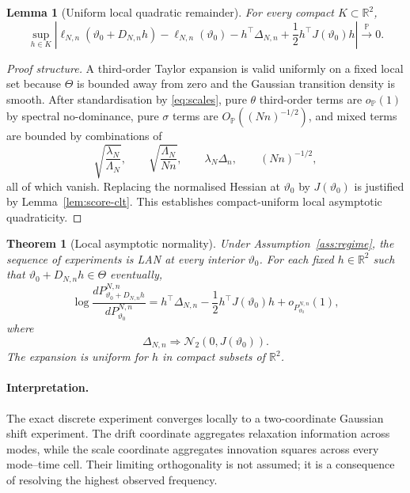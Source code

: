 \documentclass[11pt]{article}
\newtheorem{theorem}[assumption]{Theorem}
\newtheorem{lemma}[assumption]{Lemma}
\theoremstyle{remark}
\newcommand{\Pp}{\mathbb P}
\newcommand{\R}{\mathbb R}
\newcommand{\1}{\mathbf 1}
\newcommand{\elln}{\ell_{N,n}}
\newcommand{\LamN}{\Lambda_N}
\newcommand{\Dn}{D_{N,n}}
\newcommand{\vzero}{\vartheta_0}
\begin{document}
\begin{lemma}[Uniform local quadratic remainder]\label{lem:remainder}
For every compact $K\subset\R^2$,
\begin{equation}\label{eq:remainder}
 \sup_{h\in K}\left|
 \elln(\vzero+\Dn h)-\elln(\vzero)
 -h^\top\Delta_{N,n}
 +\frac12h^\top J(\vzero)h
 \right|
 \overset{\Pp}{\longrightarrow}0.
\end{equation}
\end{lemma}

\begin{proof}[Proof structure]
A third-order Taylor expansion is valid uniformly on a fixed local set because $\Theta$ is bounded away from zero and the Gaussian transition density is smooth.  After standardisation by \eqref{eq:scales}, pure $\theta$ third-order terms are $o_{\Pp}(1)$ by spectral no-dominance, pure $\sigma$ terms are $O_{\Pp}((Nn)^{-1/2})$, and mixed terms are bounded by combinations of
\[
 \sqrt{\frac{\lambda_N}{\LamN}},
 \qquad
 \sqrt{\frac{\LamN}{Nn}},
 \qquad
 \lambda_N\Delta_n,
 \qquad
 (Nn)^{-1/2},
\]
all of which vanish.  Replacing the normalised Hessian at $\vzero$ by $J(\vzero)$ is justified by Lemma~\ref{lem:score-clt}.  This establishes compact-uniform local asymptotic quadraticity.
\end{proof}

\begin{theorem}[Local asymptotic normality]\label{thm:LAN}
Under Assumption~\ref{ass:regime}, the sequence of experiments is LAN at every interior $\vzero$.  For each fixed $h\in\R^2$ such that $\vzero+\Dn h\in\Theta$ eventually,
\begin{equation}\label{eq:LAN}
 \log\frac{dP_{\vzero+\Dn h}^{N,n}}
 {dP_{\vzero}^{N,n}}
 =h^\top\Delta_{N,n}
 -\frac12h^\top J(\vzero)h
 +o_{P_{\vzero}^{N,n}}(1),
\end{equation}
where
\[
 \Delta_{N,n}\Rightarrow\mathcal N_2(0,J(\vzero)).
\]
The expansion is uniform for $h$ in compact subsets of $\R^2$.
\end{theorem}

\paragraph{Interpretation.}
The exact discrete experiment converges locally to a two-coordinate Gaussian shift experiment.  The drift coordinate aggregates relaxation information across modes, while the scale coordinate aggregates innovation squares across every mode--time cell.  Their limiting orthogonality is not assumed; it is a consequence of resolving the highest observed frequency.
\end{document}
